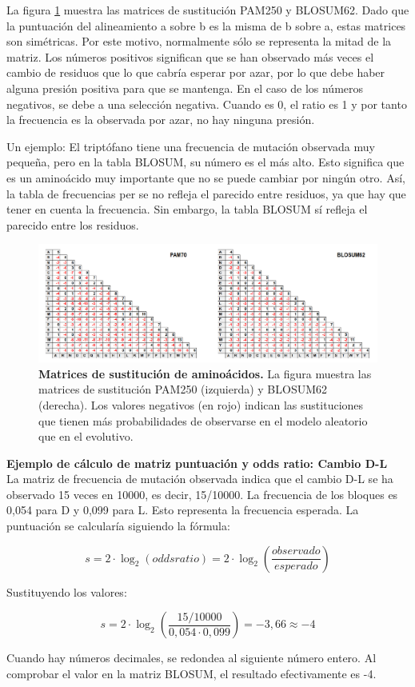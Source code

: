 La figura \ref{fig:substitution} muestra las matrices de sustitución PAM250 y BLOSUM62. Dado que la puntuación del alineamiento a sobre b es la misma de b sobre a, estas matrices son simétricas. Por este motivo, normalmente sólo se representa la mitad de la matriz. Los números positivos significan que se han observado más veces el cambio de residuos que lo que cabría esperar por azar, por lo que debe haber alguna presión positiva para que se mantenga. En el caso de los números negativos, se debe a una selección negativa. Cuando es 0, el ratio es 1 y por tanto la frecuencia es la observada por azar, no hay ninguna presión. 

Un ejemplo: El triptófano tiene una frecuencia de mutación observada muy pequeña, pero en la tabla BLOSUM, su número es el más alto. Esto significa que es un aminoácido muy importante que no se puede cambiar por ningún otro. Así, la tabla de frecuencias per se no refleja el parecido entre residuos, ya que hay que tener en cuenta la frecuencia. Sin embargo, la tabla BLOSUM sí refleja el parecido entre los residuos.   

\begin{figure}[htbp]
\centering
\includegraphics[width = \textwidth]{figs/substitution-matrix.png}
\caption{\textbf{Matrices de sustitución de aminoácidos.} La figura muestra las matrices de sustitución PAM250 (izquierda) y BLOSUM62 (derecha). Los valores negativos (en rojo) indican las sustituciones que tienen más probabilidades de observarse en el modelo aleatorio que en el evolutivo.}
\label{fig:substitution}
\end{figure}

\begin{table}[htbp]
\begin{mdframed}[backgroundcolor=black!10]
\textbf{Ejemplo de cálculo de matriz puntuación y odds ratio: Cambio D-L} \\
La matriz de frecuencia de mutación observada indica que el cambio D-L se ha observado 15 veces en 10000, es decir, 15/10000. La frecuencia de los bloques es 0,054 para D y 0,099 para L. Esto representa la frecuencia esperada. La puntuación se calcularía siguiendo la fórmula:

$$s = 2 \cdot \log_2(odds ratio) = 2 \cdot \log_2(\frac{observado}{esperado})$$

Sustituyendo los valores:

$$s = 2 \cdot \log_2(\frac{15/10000}{0,054 \cdot 0,099}) = -3,66 \approx -4$$

Cuando hay números decimales, se redondea al siguiente número entero. Al comprobar el valor en la matriz BLOSUM, el resultado efectivamente es -4.
\end{mdframed}
\end{table}


